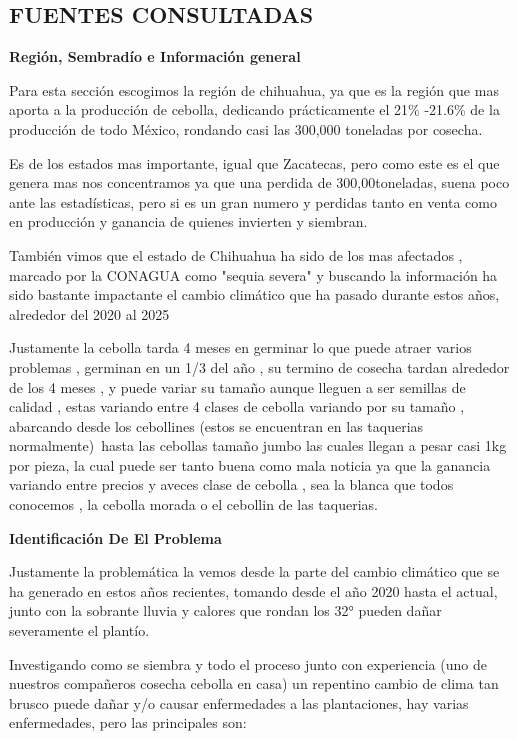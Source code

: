 \documentclass[12pt]{article}
\begin{document}
\subsection{FUENTES CONSULTADAS}
\newpage
\begin{center}
	{\huge \textbf{Región, Sembradío e Información general} }
\end{center}
\vspace{1cm} 
{\large %
Para esta sección escogimos la región de chihuahua, ya que es la región que mas aporta a la producción de cebolla, dedicando prácticamente el 21\% -21.6\% de la producción de todo México, rondando casi las 300,000 toneladas por cosecha.

Es de los estados mas importante, igual que Zacatecas, pero como este es el que genera mas nos concentramos ya que una perdida de 300,00toneladas, suena poco ante las estadísticas, pero si es un gran numero y perdidas tanto en venta como en producción y ganancia de quienes invierten y siembran.

También vimos que el estado de Chihuahua ha sido de los mas afectados , marcado por la CONAGUA como "sequia severa" y buscando la información ha sido bastante impactante el cambio climático que ha pasado durante estos años, alrededor del 2020 al 2025

Justamente la cebolla tarda 4 meses en germinar lo que puede atraer varios problemas , germinan en un 1/3 del año , su termino de cosecha tardan alrededor de los 4 meses , y puede variar su tamaño aunque lleguen a ser semillas de calidad , estas variando entre 4 clases de cebolla variando por su tamaño , abarcando desde los cebollines (estos se encuentran en las taquerias normalmente)\ hasta las cebollas tamaño jumbo las cuales llegan a pesar casi 1kg por pieza, la cual puede ser tanto buena como mala noticia ya que la ganancia variando entre precios y aveces clase de cebolla , sea la blanca que todos conocemos , la cebolla morada o el cebollin de las taquerias.
\newpage
\begin{center}
	{\huge \textbf{Identificación  De El Problema}}
\end{center}
\vspace{1cm} 
{\large %
	Justamente la problemática la vemos desde la parte del cambio climático que se ha generado en estos años recientes, tomando desde el año 2020 hasta el actual, junto con la sobrante lluvia y calores que rondan los 32° pueden dañar severamente el plantío.
	
	Investigando como se siembra y todo el proceso junto con experiencia (uno de nuestros compañeros cosecha cebolla en casa) un repentino cambio de clima tan brusco puede dañar y/o causar enfermedades a las plantaciones, hay varias enfermedades, pero las principales son:
	
}}
\end{document}
